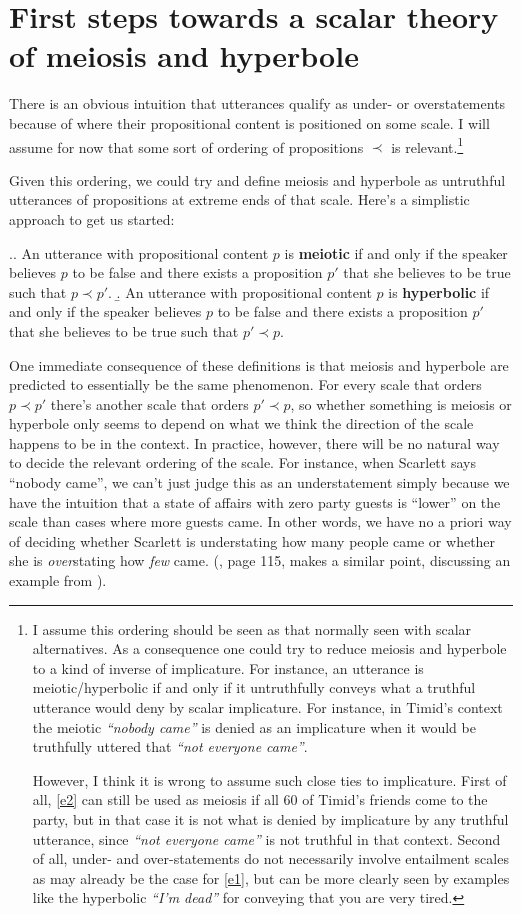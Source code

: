 \documentclass[a4paper,12pt,twoside]{article}
\begin{document}
\section{First steps towards a scalar theory of meiosis and hyperbole}
\label{sec:orgf48d1d8}

There is an obvious intuition that utterances qualify as under- or overstatements because of where their propositional content is positioned on some scale. 
I will assume for now that some sort of ordering of propositions $\prec$ is relevant.\footnote{I assume this ordering should be seen as that normally seen with scalar alternatives. As a consequence one could try to reduce meiosis and hyperbole to a kind of inverse of implicature. For instance, an utterance is meiotic/hyperbolic if and only if it untruthfully conveys what a truthful utterance would deny by scalar implicature. For instance, in Timid's context the meiotic {\em ``nobody came''} is denied as an implicature when it would be truthfully uttered that {\em ``not everyone came''}. 

However, I think it is wrong to assume such close ties to implicature. First of all, \ref{e2} can still be used as meiosis if all 60 of Timid's friends come to the party, but in that case it is not what is denied by implicature by any truthful utterance, since {\em ``not everyone came''} is not truthful in that context. Second of all, under- and over-statements do not necessarily involve entailment scales as may already be the case for \ref{e1}, but can be more clearly seen by examples like the hyperbolic {\em ``I'm dead''} for conveying that you are very tired. }

 Given this ordering, we could try and define meiosis and hyperbole as untruthful utterances of propositions at extreme ends of that scale. Here's a simplistic approach to get us started:

\ex.\a. An utterance with propositional content $p$ is {\bf meiotic} if and only if the speaker believes $p$ to be false and there exists a proposition $p'$ that she believes to be true such that $p\prec p'$.
\b. An utterance with propositional content $p$ is {\bf hyperbolic} if and only if the speaker believes $p$ to be false and there exists a proposition $p'$ that she believes to be true such that $p'\prec p$.

One immediate consequence of these definitions is that meiosis and hyperbole are predicted to essentially be the same phenomenon. 
For every scale that orders $p\prec p'$ there's another scale that orders $p'\prec p$, so whether something is meiosis or hyperbole only seems to depend on what we think the direction of the scale happens to be in the context.
In practice, however, there will be no natural way to decide the relevant ordering of the scale. For instance, when Scarlett says ``nobody came'', we can't just judge this as an understatement simply because we have the intuition that a state of affairs with zero party guests is ``lower'' on the scale than cases where more guests came. In other words, we have  no a priori way of deciding whether Scarlett is understating how many people came or whether she is \emph{over}stating how \emph{few} came. (\citealt{walton_17}, page 115, makes a similar point, discussing an example from \citealt{gibbs2007}).
\end{document}

